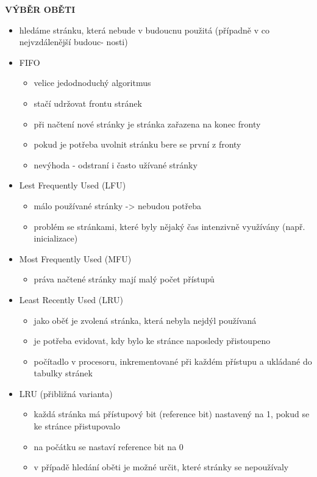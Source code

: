 \documentclass[10pt,a4paper]{article}
\begin{document}
\textbf{VÝBĚR OBĚTI}
\begin{itemize}
	\item hledáme stránku, která nebude v budoucnu použitá (případně v co nejvzdálenější budouc-
nosti)
	\item FIFO
	\begin{itemize}
		\item velice jedodnoduchý algoritmus
		\item stačí udržovat frontu stránek
		\item při načtení nové stránky je stránka zařazena na konec fronty
		\item pokud je potřeba uvolnit stránku bere se první z fronty
		\item nevýhoda - odstraní i často užívané stránky
	\end{itemize}
	\item Lest Frequently Used (LFU)
	\begin{itemize}
		\item málo používané stránky -> nebudou potřeba
		\item problém se stránkami, které byly nějaký čas intenzivně využívány (např. inicializace)
	\end{itemize}
	\item Most Frequently Used (MFU)
	\begin{itemize}
		\item práva načtené stránky mají malý počet přístupů
	\end{itemize}
	\item Least Recently Used (LRU)
	\begin{itemize}
		\item jako oběť je zvolená stránka, která nebyla nejdýl používaná
		\item je potřeba evidovat, kdy bylo ke stránce naposledy přistoupeno
		\item počítadlo v procesoru, inkrementované při každém přístupu a ukládané do tabulky
stránek
	\end{itemize}
	\item LRU (přibližná varianta)
	\begin{itemize}
		\item každá stránka má přístupový bit (reference bit) nastavený na 1, pokud se ke stránce přistupovalo
		\item na počátku se nastaví reference bit na 0
		\item v případě hledání oběti je možné určit, které stránky se nepoužívaly
	\end{itemize}
\end{itemize}
\end{document}
